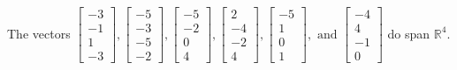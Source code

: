 \begin{exercise}
\begin{exerciseStatement}
  \end{exerciseStatement}
  \begin{exerciseAnswer}
   The vectors \(\left[\begin{array}{r}
-3 \\
-1 \\
1 \\
-3
\end{array}\right] , \left[\begin{array}{r}
-5 \\
-3 \\
-5 \\
-2
\end{array}\right] , \left[\begin{array}{r}
-5 \\
-2 \\
0 \\
4
\end{array}\right] , \left[\begin{array}{r}
2 \\
-4 \\
-2 \\
4
\end{array}\right] , \left[\begin{array}{r}
-5 \\
1 \\
0 \\
1
\end{array}\right] , \text{ and } \left[\begin{array}{r}
-4 \\
4 \\
-1 \\
0
\end{array}\right]\) 
  	 do  
	span \(\mathbb{R}^4\).
  


  \end{exerciseAnswer}
\end{exercise}